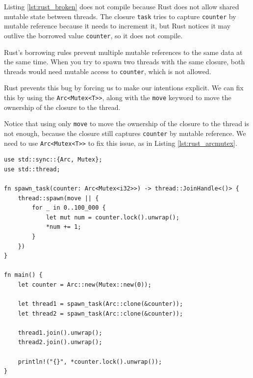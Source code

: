 \begin{paracol}{2}
\colfill
Listing \ref{lst:rust_broken} does not compile because Rust does not allow shared mutable state between threads. 
   The closure \lstinline|task| tries to capture \lstinline|counter| by mutable reference because it needs to increment it, but Rust notices it may outlive the borrowed value \lstinline|counter|, so it does not compile.
   
   Rust’s borrowing rules prevent multiple mutable references to the same data at the same time. When you try to spawn two threads with the same closure, both threads would need mutable access to \lstinline|counter|, which is not allowed.
   
   Rust prevents this bug by forcing us to make our intentions explicit. We can fix this by using the \lstinline|Arc<Mutex<T>>|, along with the \lstinline|move| keyword to move the ownership of the closure to the thread.

   Notice that using only \lstinline|move| to move the ownership of the closure to the thread is not enough, because the closure still captures \lstinline|counter| by mutable reference. We need to use \lstinline|Arc<Mutex<T>>| to fix this issue, as in Listing \ref{lst:rust_arcmutex}.
\colfill
   \switchcolumn

   \begin{lstlisting}[caption={Same as Lst.\ref{lst:rust_arcmutex}, but with a function to spawn tasks, avoiding code duplication},label={lst:rust_arcmutex_spawn}]
use std::sync::{Arc, Mutex};
use std::thread;

fn spawn_task(counter: Arc<Mutex<i32>>) -> thread::JoinHandle<()> {
    thread::spawn(move || {
        for _ in 0..100_000 {
            let mut num = counter.lock().unwrap();
            *num += 1;
        }
    })
}

fn main() {
    let counter = Arc::new(Mutex::new(0));
    
    let thread1 = spawn_task(Arc::clone(&counter));
    let thread2 = spawn_task(Arc::clone(&counter));
    
    thread1.join().unwrap();
    thread2.join().unwrap();

    println!("{}", *counter.lock().unwrap());
}
   \end{lstlisting}
   
\end{paracol}



